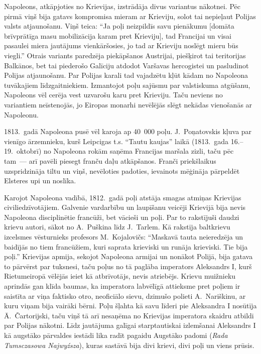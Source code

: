 \documentclass[twoside,a5paper,12pt,fleqn,openany]{extbook}
\newcommand{\pltxti}[1]{\textit{\textpolish{#1}}}
\begin{document}
Napoleons, atkāpjoties no Krievijas, izstrādāja divus variantus nākotnei. Pēc pirmā viņš bija gatavs kompromisa mieram ar Krieviju, solot tai nepieļaut Polijas valsts atjaunošanu. Viņš teica: ``Ja poļi neizpildīs savu pienākumu [domāta brīvprātīga masu mobilizācija karam pret Krieviju], tad Francijai un visai pasaulei miera jautājums vienkāršosies, jo tad ar Krieviju noslēgt mieru būs viegli.'' Otrais variants paredzēja piekāpšanos Austrijai, piešķirot tai teritorijas Balkānos, bet tai piederošo Galīciju atdodot Varšavas hercogistei un pasludinot Polijas atjaunošanu. Par Polijas karali tad vajadzētu kļūt kādam no Napoleona tuvākajiem līdzgaitniekiem. Izmantojot poļu sajūsmu par valstiskuma atgūšanu, Napoleons vēl cerēja vest uzvarošu karu pret Krieviju. Taču neviens no variantiem neīstenojās, jo Eiropas monarhi nevēlējās slēgt nekādas vienošanās ar Napoleonu.

1813.~gadā Napoleona pusē vēl karoja ap 40~000 poļu. J.~Poņatovskis kļuva par vienīgo ārzemnieku, kurš Leipcigas t.s. ``Tautu kaujas'' laikā (1813.~gada 16.--19.~oktobrī) no Napoleona rokām saņēma Francijas maršala zizli, taču pēc tam~--- arī pavēli piesegt franču daļu atkāpšanos. Franči priekšlaikus uzspridzināja tiltu un viņš, nevēloties padoties, ievainots mēģināja pārpeldēt Elsteres upi un noslīka.

Karojot Napoleona vadībā, 1812.~gadā poļi atstāja smagas atmiņas Krievijas civiliedzīvotājiem. Galvenie vardarbību un laupīšanu veicēji Krievijā bija nevis Napoleona disciplinētie francūži, bet vācieši un poļi. Par to rakstījuši daudzi krievu autori, sākot no A.~Puškina līdz J.~Tarlem. Kā rakstīja baltkrievu izcelsmes vēsturnieks profesors M.~Kojalovičs: ``Maskavā tauta neieredzēja un baidījās no tiem francūžiem, kuri saprata krieviski un runāja krieviski. Tie bija poļi.'' Krievijas apmija, sekojot Napoleona armijai un nonākot Polijā, bija gatava to pārvērst par tuksnesi, taču poļus no tā paglāba imperators Aleksandrs I, kurš Rietumeiropā vēlējās ieiet kā atbrīvotājs, nevis atriebējs. Krievu muižnieku aprindās gan klīda baumas, ka imperatora labvēlīgā attieksme pret poļiem ir saistīta ar viņa faktisko otro, neoficiālo sievu, dzimušo polieti A.~Nariškinu, ar kuru viņam bija vairāki bērni. Poļu šļahta kā savu līderi pie Aleksandra I nosūtīja Ā.~Čartorijski, taču viņš tā arī nesaņēma no Krievijas imperatora skaidru atbildi par Polijas nākotni. Līdz jautājuma galīgai starptautiskai izlemšanai Aleksandrs I kā augstāko pārvaldes iestādi lika radīt pagaidu Augstāko padomi (\pltxti{Rada Tumsczasowa Najwyźsza}), kuras sastāvā bija divi krievi, divi poļi un viens prūsis.
\end{document}

